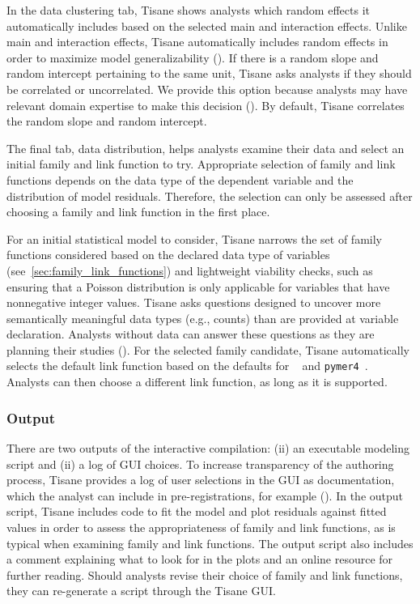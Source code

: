 In the data clustering tab, Tisane shows analysts which random effects it
automatically includes based on the selected main and interaction effects. Unlike
main and interaction effects, Tisane automatically includes random effects
in order to maximize model generalizability (\dcValidity). If there is a random
slope and random intercept pertaining to the same unit, Tisane asks analysts if
they should be correlated or uncorrelated. We provide this option because
analysts may have relevant domain expertise to make this decision (\dcGuidance).
By default, Tisane correlates the random slope and random intercept.

The final tab, data distribution, helps analysts examine their data and select
an initial family and link function to try. Appropriate selection of family and
link functions depends on the data type of the dependent variable and the
distribution of model residuals. Therefore, the selection can only be assessed
after choosing a family and link function in the first place.

For an initial statistical model to consider, Tisane narrows the set of family
functions considered based on the declared data type of variables
(see~\autoref{sec:family_link_functions}) and lightweight viability checks, such
as ensuring that a Poisson distribution is only applicable for variables that
have nonnegative integer values. Tisane asks questions designed to uncover
more semantically meaningful data types (e.g., counts) than are provided at
variable declaration. Analysts without data can answer these questions as they
are planning their studies (\dcStatisticalPlanning). For the selected family
candidate, Tisane automatically selects the default link function based on the
defaults for \statsmodels~\cite{statsmodelsRef} and
\texttt{pymer4}~\cite{jolly2018pymer4}. Analysts can then choose a different
link function, as long as it is supported.

\subsubsection{Output}
There are two outputs of the interactive compilation: (ii) an executable modeling script and (ii) a log of GUI
choices. To increase transparency of the
authoring process, Tisane provides a log of user selections in the GUI as
documentation, which the analyst can include in pre-registrations, for example
(\dcStatisticalPlanning). In the output script, Tisane includes code to fit the
model and plot residuals against fitted values in order to assess the
appropriateness of family and link functions, as is typical when examining
family and link functions. The output script also includes a comment explaining
what to look for in the plots and an online resource for further reading. Should
analysts revise their choice of family and link functions, they can re-generate
a script through the Tisane GUI.